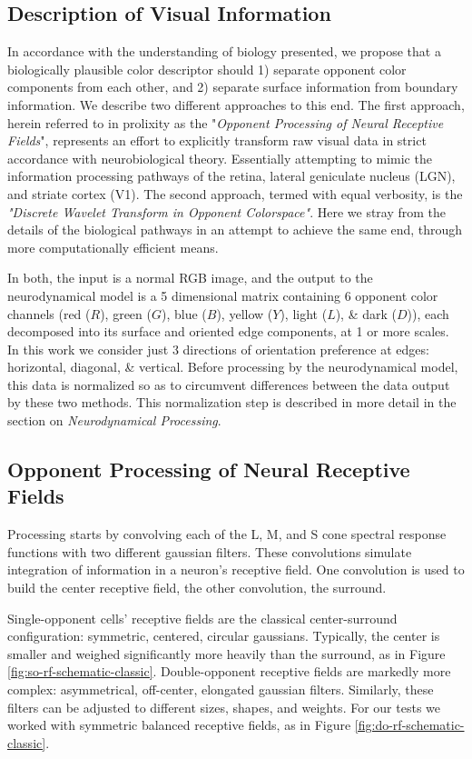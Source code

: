 \documentclass[journal,onecolumn]{IEEEtran}
\begin{document}
\subsection*{Description of Visual Information}

In accordance with the understanding of biology presented, we propose that a biologically plausible color descriptor should 1) separate opponent color components from each other, and 2) separate surface information from boundary information. We describe two different approaches to this end. The first approach, herein referred to in prolixity as the "\textit{Opponent Processing of Neural Receptive Fields}", represents an effort to explicitly transform raw visual data in strict accordance with neurobiological theory. Essentially attempting to mimic the information processing pathways of the retina, lateral geniculate nucleus (LGN), and striate cortex (V1). The second approach, termed with equal verbosity, is the \textit{"Discrete Wavelet Transform in Opponent Colorspace"}. Here we stray from the details of the biological pathways in an attempt to achieve the same end, through more computationally efficient means.

In both, the input is a normal RGB image, and the output to the neurodynamical model is a 5 dimensional matrix containing 6 opponent color channels (red ($R$), green ($G$), blue ($B$), yellow ($Y$), light ($L$), \& dark ($D$)), each decomposed into its surface and oriented edge components, at 1 or more scales. In this work we consider just 3 directions of orientation preference at edges: horizontal, diagonal, \& vertical. Before processing by the neurodynamical model, this data is normalized so as to circumvent differences between the data output by these two methods. This normalization step is described in more detail in the section on \textit{Neurodynamical Processing}.

\subsection{Opponent Processing of Neural Receptive Fields}

Processing starts by convolving each of the L, M, and S cone spectral response functions with two different gaussian filters. These convolutions simulate integration of information in a neuron's receptive field. One convolution is used to build the center receptive field, the other convolution, the surround.

Single-opponent cells' receptive fields are the classical center-surround configuration: symmetric, centered, circular gaussians. Typically, the center is smaller and weighed significantly more heavily than the surround, as in Figure \ref{fig:so-rf-schematic-classic}. Double-opponent receptive fields are markedly more complex: asymmetrical, off-center, elongated gaussian filters. Similarly, these filters can be adjusted to different sizes, shapes, and weights. For our tests we worked with symmetric balanced receptive fields, as in Figure \ref{fig:do-rf-schematic-classic}.
\end{document}
